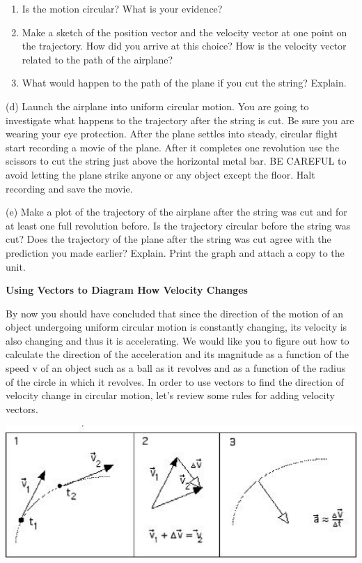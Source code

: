 \begin{enumerate}
\item Is the motion circular? What is your evidence?\vspace{10mm}

\item Make a sketch of the position vector and the velocity vector at one point on
the trajectory. How did you arrive at this choice? How is the velocity vector
related to the path of the airplane?\vspace{30mm}

\item What would happen to the path of the plane if you cut the string? Explain.\vspace{20mm}

\end{enumerate}
(d) Launch the airplane into uniform circular motion. You are going to investigate
what happens to the trajectory after the string is cut. Be sure you are wearing
your eye protection. After the plane settles into steady, circular flight start
recording a movie of the plane. After it completes one revolution use the scissors
to cut the string just above the horizontal metal bar. BE CAREFUL to avoid letting
the plane strike anyone or any object except the floor. Halt recording and save
the movie.

(e) Make a plot of the trajectory of the airplane after the string was cut and
for at least one full revolution before. Is the trajectory circular before the
string was cut? Does the trajectory of the plane after the string was cut agree
with the prediction you made earlier? Explain. Print the graph and attach a
copy to the unit.
\vspace{20mm}

\textbf{Using Vectors to Diagram How Velocity Changes} 

By now you should have concluded that since the direction of the motion of an
object undergoing uniform circular motion is constantly changing, its velocity
is also changing and thus it is accelerating. We would like you to figure out
how to calculate the direction of the acceleration and its magnitude as a function
of the speed v of an object such as a ball as it revolves and as a function
of the radius of the circle in which it revolves. In order to use vectors to
find the direction of velocity change in circular motion, let's review some
rules for adding velocity vectors.

\vspace{0.3cm}
{\par\centering \includegraphics{circ_motion/circ_motion_fig1.eps} \par}
\vspace{0.3cm}

